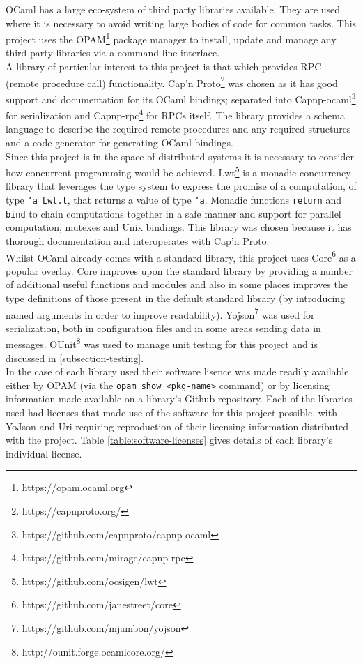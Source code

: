 OCaml has a large eco-system of third party libraries available. They are used where it is necessary to avoid writing large bodies of code for common tasks. This project uses the OPAM\footnote{https://opam.ocaml.org} package manager to install, update and manage any third party libraries via a command line interface. \\ 

A library of particular interest to this project is that which provides RPC (remote procedure call) functionality. Cap'n Proto\footnote{https://capnproto.org/} was chosen as it has good support and documentation for its OCaml bindings; separated into Capnp-ocaml\footnote{https://github.com/capnproto/capnp-ocaml} for serialization and Capnp-rpc\footnote{https://github.com/mirage/capnp-rpc} for RPCs itself. The library provides a schema language to describe the required remote procedures and any required structures and a code generator for generating OCaml bindings. \\

Since this project is in the space of distributed systems it is necessary to consider how concurrent programming would be achieved. Lwt\footnote{https://github.com/ocsigen/lwt} is a monadic concurrency library that leverages the type system to express the promise of a computation, of type \texttt{'a Lwt.t}, that returns a value of type \texttt{'a}. Monadic functions \texttt{return} and \texttt{bind} to chain computations together in a safe manner and support for parallel computation, mutexes and Unix bindings. This library was chosen because it has thorough documentation and interoperates with Cap'n Proto. \\

Whilst OCaml already comes with a standard library, this project uses Core\footnote{https://github.com/janestreet/core} as a popular overlay. Core improves upon the standard library by providing a number of additional useful functions and modules and also in some places improves the type definitions of those present in the default standard library (by introducing named arguments in order to improve readability). Yojson\footnote{https://github.com/mjambon/yojson} was used for serialization, both in configuration files and in some areas sending data in messages. OUnit\footnote{http://ounit.forge.ocamlcore.org/} was used to manage unit testing for this project and is discussed in \ref{subsection-testing}. \\

In the case of each library used their software lisence was made readily available either by OPAM (via the \texttt{opam show <pkg-name>} command) or by licensing information made available on a library's Github repository. Each of the libraries used had licenses that made use of the software for this project possible, with YoJson and Uri requiring reproduction of their licensing information distributed with the project. Table \ref{table:software-licenses} gives details of each library's individual license.

